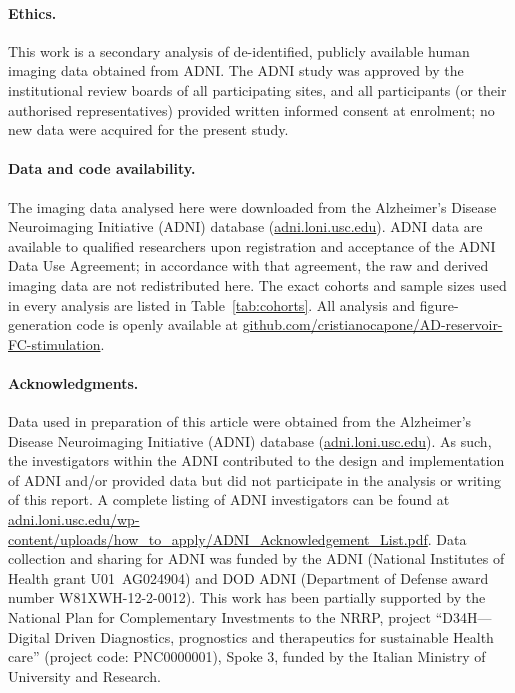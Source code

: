 \documentclass[11pt]{article}
\begin{document}
\paragraph{Ethics.}
This work is a secondary analysis of de-identified, publicly available human
imaging data obtained from ADNI. The ADNI study was approved by the
institutional review boards of all participating sites, and all participants
(or their authorised representatives) provided written informed consent at
enrolment; no new data were acquired for the present study.

\paragraph{Data and code availability.}
The imaging data analysed here were downloaded from the Alzheimer's Disease
Neuroimaging Initiative (ADNI) database
(\href{https://adni.loni.usc.edu}{adni.loni.usc.edu}). ADNI data are available
to qualified researchers upon registration and acceptance of the ADNI Data Use
Agreement; in accordance with that agreement, the raw and derived imaging data
are not redistributed here. The exact cohorts and sample sizes used in every
analysis are listed in Table~\ref{tab:cohorts}. All analysis and
figure-generation code is openly available at
\href{https://github.com/cristianocapone/AD-reservoir-FC-stimulation}%
{github.com/cristianocapone/AD-reservoir-FC-stimulation}.

\paragraph{Acknowledgments.}
Data used in preparation of this article were obtained from the Alzheimer's
Disease Neuroimaging Initiative (ADNI) database
(\href{https://adni.loni.usc.edu}{adni.loni.usc.edu}). As such, the
investigators within the ADNI contributed to the design and implementation of
ADNI and/or provided data but did not participate in the analysis or writing of
this report. A complete listing of ADNI investigators can be found at
\href{https://adni.loni.usc.edu/wp-content/uploads/how_to_apply/ADNI_Acknowledgement_List.pdf}%
{adni.loni.usc.edu/wp-content/uploads/how\_to\_apply/ADNI\_Acknowledgement\_List.pdf}.
Data collection and sharing for ADNI was funded by the ADNI (National Institutes
of Health grant U01~AG024904) and DOD ADNI (Department of Defense award number
W81XWH-12-2-0012).
This work has been partially supported by the National Plan for Complementary
Investments to the NRRP, project ``D34H---Digital Driven Diagnostics, prognostics
and therapeutics for sustainable Health care'' (project code: PNC0000001), Spoke
3, funded by the Italian Ministry of University and Research.
\end{document}
